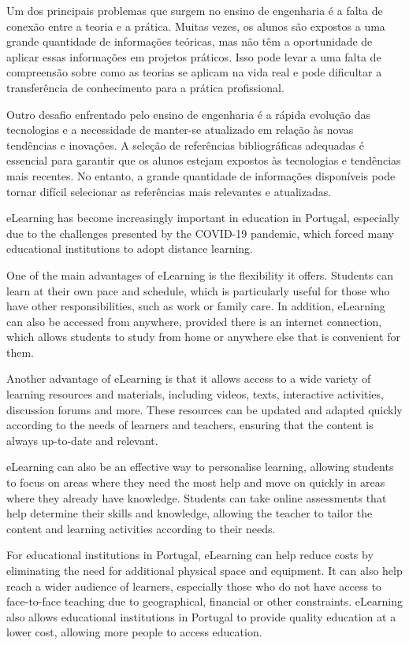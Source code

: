 Um dos principais problemas que surgem no ensino de engenharia é a falta de conexão entre a teoria e a prática. Muitas vezes, os alunos são expostos a uma grande quantidade de informações teóricas, mas não têm a oportunidade de aplicar essas informações em projetos práticos. Isso pode levar a uma falta de compreensão sobre como as teorias se aplicam na vida real e pode dificultar a transferência de conhecimento para a prática profissional.

Outro desafio enfrentado pelo ensino de engenharia é a rápida evolução das tecnologias e a necessidade de manter-se atualizado em relação às novas tendências e inovações. A seleção de referências bibliográficas adequadas é essencial para garantir que os alunos estejam expostos às tecnologias e tendências mais recentes. No entanto, a grande quantidade de informações disponíveis pode tornar difícil selecionar as referências mais relevantes e atualizadas.

eLearning has become increasingly important in education in Portugal, especially due to the challenges presented by the COVID-19 pandemic, which forced many educational institutions to adopt distance learning.

One of the main advantages of eLearning is the flexibility it offers. Students can learn at their own pace and schedule, which is particularly useful for those who have other responsibilities, such as work or family care. In addition, eLearning can also be accessed from anywhere, provided there is an internet connection, which allows students to study from home or anywhere else that is convenient for them.

Another advantage of eLearning is that it allows access to a wide variety of learning resources and materials, including videos, texts, interactive activities, discussion forums and more. These resources can be updated and adapted quickly according to the needs of learners and teachers, ensuring that the content is always up-to-date and relevant.

eLearning can also be an effective way to personalise learning, allowing students to focus on areas where they need the most help and move on quickly in areas where they already have knowledge. Students can take online assessments that help determine their skills and knowledge, allowing the teacher to tailor the content and learning activities according to their needs.

For educational institutions in Portugal, eLearning can help reduce costs by eliminating the need for additional physical space and equipment. It can also help reach a wider audience of learners, especially those who do not have access to face-to-face teaching due to geographical, financial or other constraints. eLearning also allows educational institutions in Portugal to provide quality education at a lower cost, allowing more people to access education.

